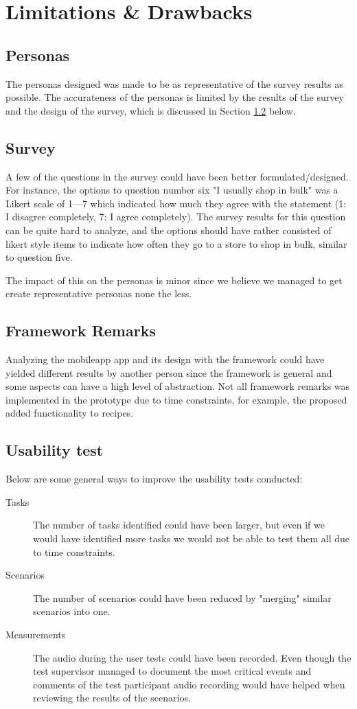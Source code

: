 \section{Limitations \& Drawbacks}
\subsection{Personas}
The personas designed was made to be as representative of the survey results as possible. The accurateness of the personas is limited by the results of the survey and the design of the survey, which is discussed in Section \ref{sec:discussion/survey} below.

\subsection{Survey}
\label{sec:discussion/survey}
A few of the questions in the survey could have been better formulated/designed. For instance, the options to question number six "I usually shop in bulk" was a Likert scale of 1---7 which indicated how much they agree with the statement (1: I disagree completely, 7: I agree completely). The survey results for this question can be quite hard to analyze, and the options should have rather consisted of likert style items to indicate how often they go to a store to shop in bulk, similar to question five.

The impact of this on the personas is minor since we believe we managed to get create representative personas none the less.

\subsection{Framework Remarks}
Analyzing the mobileapp app and its design with the framework could have yielded different results by another person since the framework is general and some aspects can have a high level of abstraction. Not all framework remarks was implemented in the prototype due to time constraints, for example, the proposed added functionality to recipes.

\subsection{Usability test}

Below are some general ways to improve the usability tests conducted:

\begin{description}
  \item[Tasks] The number of tasks identified could have been larger, but even if we would have identified more tasks we would not be able to test them all due to time constraints.
  \item[Scenarios] The number of scenarios could have been reduced by "merging" similar scenarios into one.
  \item[Measurements] The audio during the user tests could have been recorded. Even though the test supervisor managed to document the most critical events and comments of the test participant audio recording would have helped when reviewing the results of the scenarios.
\end{description}

